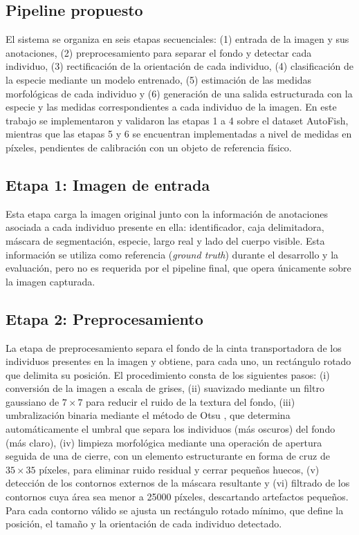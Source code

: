 \documentclass[conference]{IEEEtran}
\begin{document}
\subsection{Pipeline propuesto}
El sistema se organiza en seis etapas secuenciales: (1) entrada de la imagen y sus anotaciones, (2) preprocesamiento para separar el fondo y detectar cada individuo, (3) rectificación de la orientación de cada individuo, (4) clasificación de la especie mediante un modelo entrenado, (5) estimación de las medidas morfológicas de cada individuo y (6) generación de una salida estructurada con la especie y las medidas correspondientes a cada individuo de la imagen. En este trabajo se implementaron y validaron las etapas 1 a 4 sobre el dataset AutoFish, mientras que las etapas 5 y 6 se encuentran implementadas a nivel de medidas en píxeles, pendientes de calibración con un objeto de referencia físico.

\subsection{Etapa 1: Imagen de entrada}
Esta etapa carga la imagen original junto con la información de anotaciones asociada a cada individuo presente en ella: identificador, caja delimitadora, máscara de segmentación, especie, largo real y lado del cuerpo visible. Esta información se utiliza como referencia (\emph{ground truth}) durante el desarrollo y la evaluación, pero no es requerida por el pipeline final, que opera únicamente sobre la imagen capturada.

\subsection{Etapa 2: Preprocesamiento}
La etapa de preprocesamiento separa el fondo de la cinta transportadora de los individuos presentes en la imagen y obtiene, para cada uno, un rectángulo rotado que delimita su posición. El procedimiento consta de los siguientes pasos: (i) conversión de la imagen a escala de grises, (ii) suavizado mediante un filtro gaussiano de $7\times7$ para reducir el ruido de la textura del fondo, (iii) umbralización binaria mediante el método de Otsu \cite{b3}, que determina automáticamente el umbral que separa los individuos (más oscuros) del fondo (más claro), (iv) limpieza morfológica mediante una operación de apertura seguida de una de cierre, con un elemento estructurante en forma de cruz de $35\times35$ píxeles, para eliminar ruido residual y cerrar pequeños huecos, (v) detección de los contornos externos de la máscara resultante y (vi) filtrado de los contornos cuya área sea menor a 25000 píxeles, descartando artefactos pequeños. Para cada contorno válido se ajusta un rectángulo rotado mínimo, que define la posición, el tamaño y la orientación de cada individuo detectado.
\end{document}
